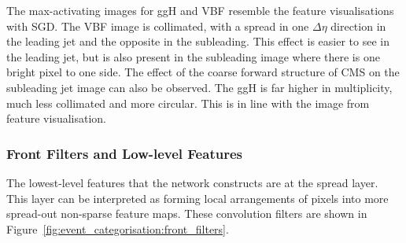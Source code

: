 The max-activating images for ggH and VBF resemble the feature visualisations with SGD. 
The VBF image is collimated, with a spread in one $\Delta\eta$ direction in the leading jet and the opposite in the subleading. 
This effect is easier to see in the leading jet, but is also present in the subleading image where there is one bright pixel to one side.
The effect of the coarse forward structure of CMS on the subleading jet image can also be observed. 
The ggH is far higher in multiplicity, much less collimated and more circular. This is in line with the image from feature visualisation. 


\subsubsection{Front Filters and Low-level Features}
The lowest-level features that the network constructs are at the spread layer. 
This layer can be interpreted as forming local arrangements of pixels into more spread-out non-sparse feature maps. 
These convolution filters are shown in Figure~\ref{fig:event_categorisation:front_filters}.

